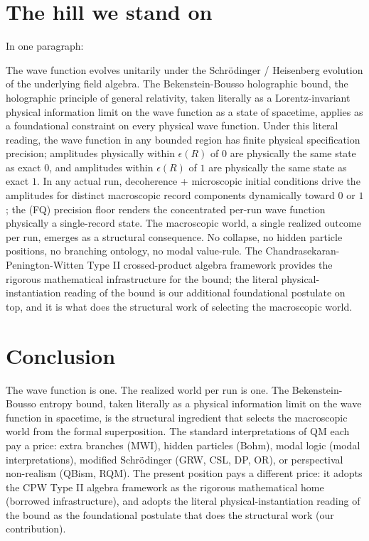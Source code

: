 \documentclass[11pt,a4paper]{article}
\newenvironment{qiqtquote}{\begin{mdframed}[style=quotestyle]}{\end{mdframed}}
\begin{document}
\section{The hill we stand on}

In one paragraph:

\begin{qiqtquote}
The wave function evolves unitarily under the Schrödinger / Heisenberg evolution of the underlying field algebra. The Bekenstein-Bousso holographic bound, the holographic principle of general relativity, taken literally as a Lorentz-invariant physical information limit on the wave function as a state of spacetime, applies as a foundational constraint on every physical wave function. Under this literal reading, the wave function in any bounded region has finite physical specification precision; amplitudes physically within $\epsilon(R)$ of $0$ are physically the same state as exact $0$, and amplitudes within $\epsilon(R)$ of $1$ are physically the same state as exact $1$. In any actual run, decoherence + microscopic initial conditions drive the amplitudes for distinct macroscopic record components dynamically toward $0$ or $1$; the (FQ) precision floor renders the concentrated per-run wave function physically a single-record state. The macroscopic world, a single realized outcome per run, emerges as a structural consequence. No collapse, no hidden particle positions, no branching ontology, no modal value-rule. The Chandrasekaran-Penington-Witten Type II crossed-product algebra framework provides the rigorous mathematical infrastructure for the bound; the literal physical-instantiation reading of the bound is our additional foundational postulate on top, and it is what does the structural work of selecting the macroscopic world.
\end{qiqtquote}

\section{Conclusion}

The wave function is one. The realized world per run is one. The Bekenstein-Bousso entropy bound, taken literally as a physical information limit on the wave function in spacetime, is the structural ingredient that selects the macroscopic world from the formal superposition. The standard interpretations of QM each pay a price: extra branches (MWI), hidden particles (Bohm), modal logic (modal interpretations), modified Schrödinger (GRW, CSL, DP, OR), or perspectival non-realism (QBism, RQM). The present position pays a different price: it adopts the CPW Type II algebra framework as the rigorous mathematical home (borrowed infrastructure), and adopts the literal physical-instantiation reading of the bound as the foundational postulate that does the structural work (our contribution).
\end{document}
